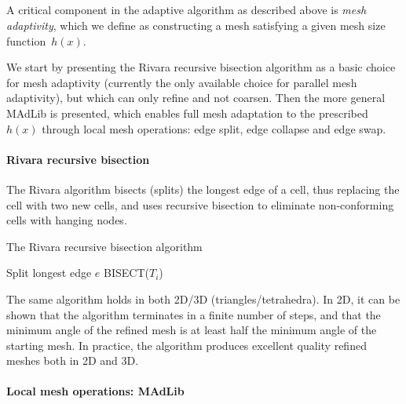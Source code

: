 \subsection{}

A critical component in the adaptive algorithm as described above is
{\em mesh adaptivity}, which we define as constructing a mesh
satisfying a given mesh size function~$h(x)$.

We start by presenting the Rivara recursive bisection algorithm
\citep{Rivara1992} as a basic choice for mesh adaptivity (currently
the only available choice for parallel mesh adaptivity), but which can
only refine and not coarsen. Then the more general MAdLib is
presented, which enables full mesh adaptation to the prescribed
$h(x)$ through local mesh operations: edge split, edge collapse and
edge swap.

\paragraph{Rivara recursive bisection}

The Rivara algorithm bisects (splits) the longest edge of a cell, thus
replacing the cell with two new cells, and uses recursive bisection to
eliminate non-conforming cells with hanging nodes.
\begin{algorithm}
\caption{The Rivara recursive bisection algorithm}
\label{alg:rivara}
\begin{algorithmic}
\State Split longest edge $e$
\State BISECT($T_i$)
\EndWhile
\EndProcedure
\end{algorithmic}
\end{algorithm}
The same algorithm holds in both 2D/3D (triangles/tetrahedra). In 2D,
it can be shown \citep{Rivara1992} that the algorithm terminates in a
finite number of steps, and that the minimum angle of the refined mesh
is at least half the minimum angle of the starting mesh. In practice,
the algorithm produces excellent quality refined meshes both in 2D and
3D.

\paragraph{Local mesh operations: MAdLib}

